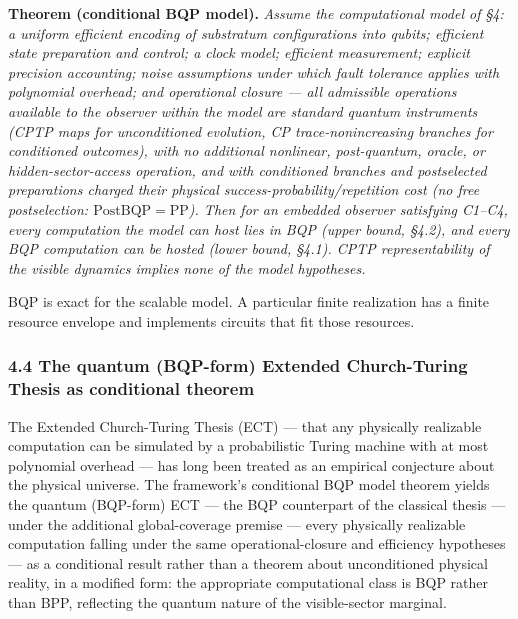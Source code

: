 \documentclass[
]{article}
\begin{document}
\textbf{Theorem (conditional BQP model).} \emph{Assume the computational
model of §4: a uniform efficient encoding of substratum configurations
into qubits; efficient state preparation and control; a clock model;
efficient measurement; explicit precision accounting; noise assumptions
under which fault tolerance applies with polynomial overhead; and
operational closure --- all admissible operations available to the
observer within the model are standard quantum instruments (CPTP maps
for unconditioned evolution, CP trace-nonincreasing branches for
conditioned outcomes), with no additional nonlinear, post-quantum,
oracle, or hidden-sector-access operation, and with conditioned branches
and postselected preparations charged their physical
success-probability/repetition cost (no free postselection:
\(\mathrm{PostBQP} = \mathrm{PP}\)). Then for an embedded observer
satisfying C1--C4, every computation the model can host lies in BQP
(upper bound, §4.2), and every BQP computation can be hosted (lower
bound, §4.1). CPTP representability of the visible dynamics implies none
of the model hypotheses.}

BQP is exact for the scalable model. A particular finite realization has
a finite resource envelope and implements circuits that fit those
resources.

\hypertarget{the-quantum-bqp-form-extended-church-turing-thesis-as-conditional-theorem}{%
\subsubsection{4.4 The quantum (BQP-form) Extended Church-Turing Thesis
as conditional
theorem}\label{the-quantum-bqp-form-extended-church-turing-thesis-as-conditional-theorem}}

The Extended Church-Turing Thesis (ECT) --- that any physically
realizable computation can be simulated by a probabilistic Turing
machine with at most polynomial overhead --- has long been treated as an
empirical conjecture about the physical universe. The framework's
conditional BQP model theorem yields the quantum (BQP-form) ECT --- the
BQP counterpart of the classical thesis --- under the additional
global-coverage premise --- every physically realizable computation
falling under the same operational-closure and efficiency hypotheses ---
as a conditional result rather than a theorem about unconditioned
physical reality, in a modified form: the appropriate computational
class is BQP rather than BPP, reflecting the quantum nature of the
visible-sector marginal.
\end{document}
